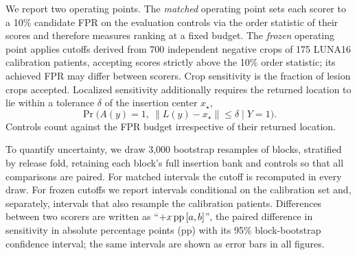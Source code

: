 We report two operating points. The \emph{matched} operating point sets each scorer to a 10\% candidate FPR on the evaluation controls via the order statistic of their scores and therefore measures ranking at a fixed budget. The \emph{frozen} operating point applies cutoffs derived from 700 independent negative crops of 175 LUNA16 calibration patients, accepting scores strictly above the 10\% order statistic; its achieved FPR may differ between scorers. Crop sensitivity is the fraction of lesion crops accepted. Localized sensitivity additionally requires the returned location to lie within a tolerance $\delta$ of the insertion center $x_\star$,
\begin{equation}
\Pr\bigl(A(y)=1,\ \|L(y)-x_\star\|\le \delta \mid Y=1\bigr).
\label{eq:locsens}
\end{equation}
Controls count against the FPR budget irrespective of their returned location.

To quantify uncertainty, we draw 3,000 bootstrap resamples of blocks, stratified by release fold, retaining each block's full insertion bank and controls so that all comparisons are paired. For matched intervals the cutoff is recomputed in every draw. For frozen cutoffs we report intervals conditional on the calibration set and, separately, intervals that also resample the calibration patients. Differences between two scorers are written as ``$+x\,\mathrm{pp}\,[a,b]$'', the paired difference in sensitivity in absolute percentage points (pp) with its 95\% block-bootstrap confidence interval; the same intervals are shown as error bars in all figures.
